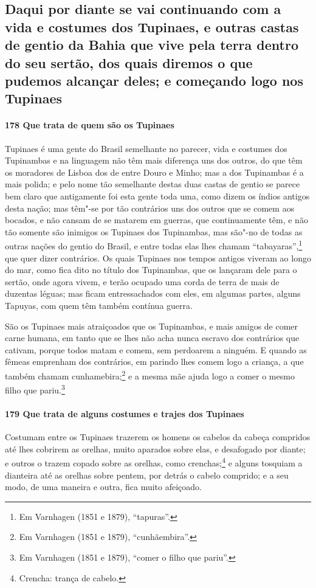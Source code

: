 \begin{linenumbers}
\subsection{Daqui por diante se vai continuando com a vida e costumes dos Tupinaes, e
outras castas de gentio da Bahia que vive pela terra dentro do seu sertão, dos quais
diremos o que pudemos alcançar deles; e começando logo nos Tupinaes}

\paragraph{178 Que trata de quem são os Tupinaes}\quad
Tupinaes é uma gente do Brasil semelhante no parecer, vida e costumes dos Tupinambas e na
linguagem não têm mais diferença uns dos outros, do que têm os moradores de Lisboa dos
de entre Douro e Minho; mas a dos Tupinambas é a mais polida; e pelo nome tão semelhante
destas duas castas de gentio se parece bem claro que antigamente foi esta gente toda uma,
como dizem os índios antigos desta nação; mas têm"-se por tão contrários uns dos outros que
se comem aos bocados, e não cansam de se matarem em guerras, que continuamente têm, e não
tão somente são inimigos os Tupinaes dos Tupinambas, mas são"-no de todas as outras nações
do gentio do Brasil, e entre todas elas lhes chamam ``tabayaras'',\footnote{ Em Varnhagen
(1851 e 1879), ``tapuras''.} que quer dizer contrários. Os quais Tupinaes nos tempos
antigos viveram ao longo do mar, como fica dito no título dos Tupinambas, que os lançaram
dele para o sertão, onde agora vivem, e terão ocupado uma corda de terra de mais de
duzentas léguas; mas ficam entressachados com eles, em algumas partes, alguns Tapuyas, com
quem têm também contínua guerra.

São os Tupinaes mais atraiçoados que os Tupinambas, e mais amigos de comer carne humana,
em tanto que se lhes não acha nunca escravo dos contrários que cativam, porque todos matam
e comem, sem perdoarem a ninguém. E quando as fêmeas emprenham dos contrários, em parindo
lhes comem logo a criança, a que também chamam cunhamebira;\footnote{ Em Varnhagen (1851 e
1879), ``cunhãembira''.} e a mesma mãe ajuda logo a comer o mesmo filho que
pariu.\footnote{ Em Varnhagen (1851 e 1879), ``comer o filho que pariu''.}

\paragraph{179 Que trata de alguns costumes e trajes dos Tupinaes}\quad
\mbox{Costumam} entre os Tupinaes trazerem os homens os cabelos da cabeça compridos até lhes
cobrirem as orelhas, muito aparados sobre elas, e desafogado por diante; e outros o trazem
copado sobre as orelhas, como crenchas;\footnote{ Crencha: trança de cabelo.} e alguns
tosquiam a dianteira até as orelhas sobre pentem, por detrás o cabelo comprido; e a seu
modo, de uma maneira e outra, fica muito afeiçoado.


\end{linenumbers}
